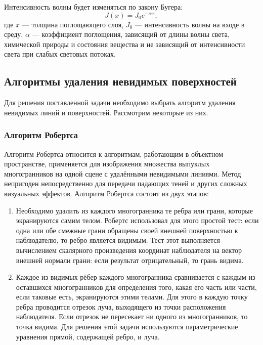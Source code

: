 \documentclass[14pt,a4paper]{extarticle}
\begin{document}
			Интенсивность волны будет изменяться по закону Бугера:
			\begin{equation}
			\label{absorb}
			J(x) = J_0e^{-\alpha x},
			\end{equation}
			где $x$ --- толщина поглощающего слоя, 
			$J_0$ --- интенсивность волны на входе в среду, 
			$\alpha$ --- коэффициент поглощения, зависящий от длины волны света, 
			химической природы и состояния вещества и не зависящий от интенсивности света при слабых световых потоках.

	\subsection{Алгоритмы удаления невидимых поверхностей}

		Для решения поставленной задачи необходимо выбрать алгоритм удаления невидимых линий и поверхностей.
		Рассмотрим некоторые из них.
		
    	\subsubsection*{Алгоритм Робертса}

    		Алгоритм Робертса относится к алгоритмам, работающим в объектном пространстве, 
    		применяется для изображения множества выпуклых многогранников на одной сцене с удалёнными невидимыми линиями.
    		Метод непригоден непосредственно для передачи падающих теней и других сложных визуальных эффектов. 
    		Алгоритм Робертса состоит из двух этапов:
    		\begin{enumerate}
    			\item Необходимо удалить из каждого многогранника те ребра или грани, которые экранируются самим телом.
    			Робертс использовал для этого простой тест: 
    			если одна или обе смежные грани обращены своей внешней поверхностью к наблюдателю, то ребро является видимым. 
    			Тест этот выполняется вычислением скалярного произведения координат наблюдателя на вектор внешней нормали грани: 
    			если результат отрицательный, то грань видима.
    			\item Каждое из видимых рёбер каждого многогранника сравнивается с каждым из оставшихся многогранников для определения того, какая его часть или части, если таковые есть, экранируются этими телами. 
    			Для этого в каждую точку ребра проводится отрезок луча, выходящего из точки расположения наблюдателя. 
    			Если отрезок не пересекает ни одного из многогранников, то точка видима. 
    			Для решения этой задачи используются параметрические уравнения прямой, содержащей ребро, и луча.
    		\end{enumerate}
\end{document}
